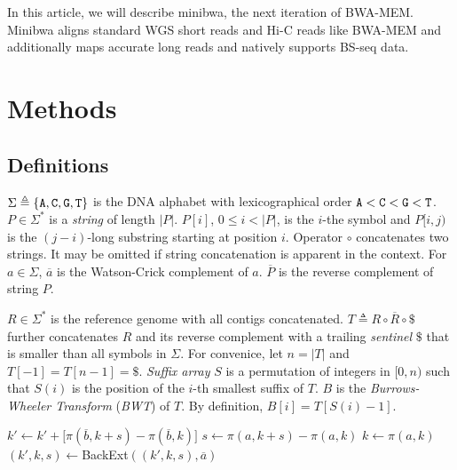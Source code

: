 \documentclass[webpdf,contemporary,large,namedate]{oup-authoring-template}%
\begin{document}
In this article, we will describe minibwa, the next iteration of BWA-MEM.
Minibwa aligns standard WGS short reads and Hi-C reads like BWA-MEM
and additionally maps accurate long reads and natively supports BS-seq data.

\section{Methods}

\subsection{Definitions}

$\Sigma\triangleq\{{\tt A},{\tt C},{\tt G},{\tt T}\}$ is the DNA alphabet
with lexicographical order ${\tt A}<{\tt C}<{\tt G}<{\tt T}$.
$P\in\Sigma^*$ is a \emph{string} of length $|P|$.
$P[i]$, $0\le i<|P|$, is the $i$-the symbol and
$P[i,j)$ is the $(j-i)$-long substring starting at position $i$.
Operator $\circ$ concatenates two strings.
It may be omitted if string concatenation is apparent in the context.
For $a\in\Sigma$, $\overline{a}$ is the Watson-Crick complement of $a$.
$\overline{P}$ is the reverse complement of string $P$.

$R\in\Sigma^*$ is the reference genome with all contigs concatenated.
$T\triangleq R\circ\overline{R}\circ\$$ further concatenates $R$ and its reverse complement
with a trailing \emph{sentinel} $\$$ that is smaller than all symbols in $\Sigma$.
For convenice, let $n=|T|$ and $T[-1]=T[n-1]=\$$.
\emph{Suffix array} $S$ is a permutation of integers in $[0,n)$ such that
$S(i)$ is the position of the $i$-th smallest suffix of $T$.
$B$ is the \emph{Burrows-Wheeler Transform} (\emph{BWT}) of $T$.
By definition, $B[i]=T[S(i)-1]$.

\begin{algorithm}[tb]
	\caption{Backward and forward extension}\label{algo:backfor}
	\begin{algorithmic}[1]
				\State $k'\gets k'+\big[\pi(\overline{b},k+s)-\pi(\overline{b},k)\big]$
			\EndFor
			\State $s\gets \pi(a,k+s)-\pi(a,k)$
			\State $k\gets \pi(a,k)$
			\State {}
		\EndProcedure
			\State $(k',k,s)\gets${\sc BackExt}$((k',k,s),\overline{a})$
			\State {}
		\EndProcedure
	\end{algorithmic}
\end{algorithm}
\end{document}
